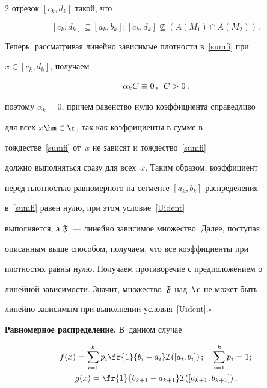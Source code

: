 \begin{multicols}{2}
отрезок $[c_k,d_k]$ такой, что

$$

[c_k,d_k]\subseteq[a_k, b_k]:[c_k,d_k]\nsubseteq\left( A(M_1)\cap

A(M_2)\right)\,.

$$

Теперь, рассматривая линейно зависимые плот\-ности в~\eqref{sumfi} при

$x\in[c_k,d_k]$, получаем


$$

\alpha_k C\equiv0\,,\enskip C>0\,,

$$

поэтому $\alpha_k=0$, причем равенство нулю коэффициента справедливо

для всех $x\hm\in\r$, так как коэффициенты в сумме в

тождестве~\eqref{sumfi} от~$x$ не зависят и тождество~\eqref{sumfi}

должно выполняться сразу для всех~$x$. Таким образом, коэффициент

перед плотностью равномерного на сегменте $[a_k, b_k]$ распределения

в~\eqref{sumfi} равен нулю, при этом условие~\eqref{Uident}

выполняется, а $\mathfrak F$~--- линейно зависимое множество. Далее, поступая

описанным выше способом, получаем, что все коэффициенты при

плотностях равны нулю. Получаем противоречие с предположением о

линейной зависимости. Значит, множество~$\mathfrak F$ над~$\r$ не может быть

линейно зависимым при выполнении условия~\eqref{Uident}.\hfill$\square$



\smallskip



\textbf{Равномерное распределение.} В~данном случае



\noindent

\begin{gather*}

f(x)=\sum\limits_{i=1}^{k}p_i\fr{1}{b_i-a_i}\Id([a_i,b_i])\,;\quad 

\sum\limits_{i=1}^{k}p_i=1;\,\\

g(x)=\fr{1}{b_{k+1}-a_{k+1}}\Id([a_{k+1},b_{k+1}])\,,


\end{gather*}
\end{multicols}
